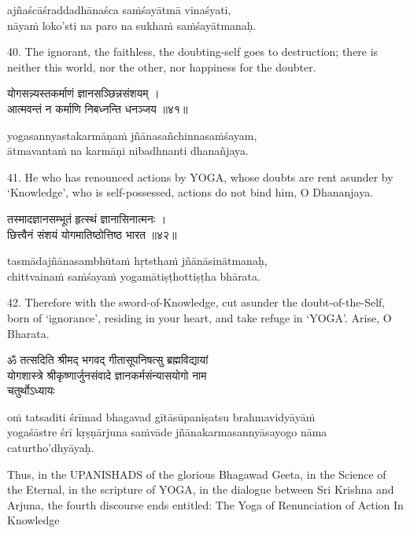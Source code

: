 \begin{transliteration}
ajñaścāśraddadhānaśca saṁśayātmā vinaśyati, \\
nāyaṁ loko'sti na paro na sukhaṁ saṁśayātmanaḥ.
\end{transliteration}

40. The ignorant, the faithless, the doubting-self goes to destruction; there
is neither this world, nor the other, nor happiness for the doubter.

\begin{gitaverse}
योगसन्न्यस्तकर्माणं ज्ञानसञ्छिन्नसंशयम् । \\
आत्मवन्तं न कर्माणि निबध्नन्ति धनञ्जय ॥४१॥
\end{gitaverse}

\begin{transliteration}
yogasannyastakarmāṇaṁ jñānasañchinnasaṁśayam, \\
ātmavantaṁ na karmāṇi nibadhnanti dhanañjaya.
\end{transliteration}

41. He who has renounced actions by YOGA, whose doubts are rent asunder by
`Knowledge', who is self-possessed, actions do not bind him, O Dhananjaya.

\begin{gitaverse}
तस्मादज्ञानसम्भूतं हृत्स्थं ज्ञानासिनात्मनः । \\
छित्त्वैनं संशयं योगमातिष्ठोत्तिष्ठ भारत ॥४२॥
\end{gitaverse}

\begin{transliteration}
tasmādajñānasambhūtaṁ hṛtsthaṁ jñānāsinātmanaḥ, \\
chittvainaṁ saṁśayaṁ yogamātiṣṭhottiṣṭha bhārata.
\end{transliteration}

42. Therefore with the sword-of-Knowledge, cut asunder the doubt-of-the-Self,
born of `ignorance', residing in your heart, and take refuge in `YOGA'. Arise,
O Bharata.

\begin{gitaverse}
ॐ तत्सदिति श्रीमद् भगवद् गीतासूपनिषत्सु ब्रह्मविद्यायां \\
योगशास्त्रे श्रीकृष्णार्जुनसंवादे ज्ञानकर्मसंन्यासयोगो नाम \\
चतुर्थोऽध्यायः
\end{gitaverse}

\begin{transliteration}
oṁ tatsaditi śrīmad bhagavad gītāsūpaniṣatsu brahmavidyāyāṁ \\
yogaśāstre śrī kṛṣṇārjuna saṁvāde jñānakarmasannyāsayogo nāma \\
caturtho'dhyāyaḥ.
\end{transliteration}

Thus, in the UPANISHADS of the glorious Bhagawad Geeta, in the Science of the
Eternal, in the scripture of YOGA, in the dialogue between Sri Krishna and
Arjuna, the fourth discourse ends entitled: The Yoga of Renunciation of Action
In Knowledge
